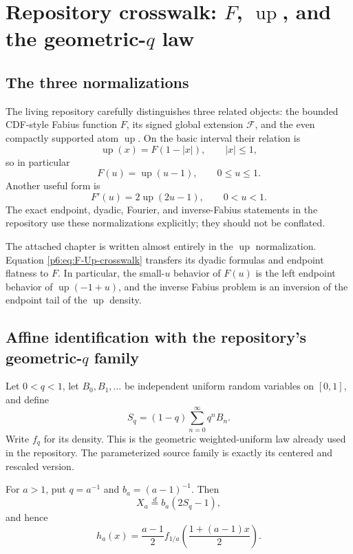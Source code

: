 \documentclass[11pt,oneside]{article}
\numberwithin{equation}{section}
\theoremstyle{definition}
\theoremstyle{remark}
\newcommand{\Up}{\operatorname{up}}
\begin{document}
\section{Repository crosswalk: \texorpdfstring{$F$}{F}, \texorpdfstring{$\Up$}{up}, and the geometric-\texorpdfstring{$q$}{q} law}

\subsection{The three normalizations}

\begin{repobox}
The living repository carefully distinguishes three related objects: the bounded
CDF-style Fabius function $F$, its signed global extension $\mathcal F$, and the
even compactly supported atom $\Up$.  On the basic interval their relation is
\begin{equation}\label{p6:eq:F-Up-crosswalk}
 \Up(x)=F(1-|x|),\qquad |x|\le1,
\end{equation}
so in particular
\[
 F(u)=\Up(u-1),\qquad 0\le u\le1.
\]
Another useful form is
\[
 F'(u)=2\Up(2u-1),\qquad 0<u<1.
\]
The exact endpoint, dyadic, Fourier, and inverse-Fabius statements in the
repository use these normalizations explicitly; they should not be conflated.
\end{repobox}

The attached chapter is written almost entirely in the $\Up$ normalization.
Equation \eqref{p6:eq:F-Up-crosswalk} transfers its dyadic formulas and endpoint
flatness to $F$.  In particular, the small-$u$ behavior of $F(u)$ is the left
endpoint behavior of $\Up(-1+u)$, and the inverse Fabius problem is an inversion
of the endpoint tail of the $\Up$ density.

\subsection{Affine identification with the repository's geometric-\texorpdfstring{$q$}{q} family}

Let $0<q<1$, let $B_0,B_1,\dots$ be independent uniform random variables on
$[0,1]$, and define
\begin{equation}\label{p6:eq:Sq}
 S_q=(1-q)\sum_{n=0}^{\infty}q^nB_n.
\end{equation}
Write $f_q$ for its density.  This is the geometric weighted-uniform law already
used in the repository.  The parameterized source family is exactly its centered
and rescaled version.

\begin{proposition}\label{p6:prop:q-crosswalk}
For $a>1$, put $q=a^{-1}$ and $b_a=(a-1)^{-1}$.  Then
\begin{equation}\label{p6:eq:Xa-Sq}
 X_a\overset d=b_a(2S_q-1),
\end{equation}
and hence
\begin{equation}\label{p6:eq:ha-fq}
 h_a(x)=\frac{a-1}{2}
 f_{1/a}\!\left(\frac{1+(a-1)x}{2}\right).
\end{equation}
\end{proposition}
\end{document}

